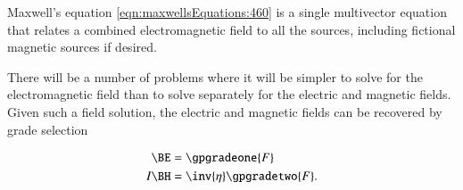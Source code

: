 Maxwell's equation \cref{eqn:maxwellsEquations:460} is a
single multivector equation that relates a combined electromagnetic field to all the sources, including fictional magnetic sources if desired.

There will be a number of problems where it will be simpler to solve for the electromagnetic field than to solve separately for the electric and magnetic fields.  Given such a field solution, the electric and magnetic fields can be recovered by grade selection

\begin{dmath}\label{eqn:isotropicMaxwells:480}
\begin{aligned}
\BE &= \gpgradeone{F} \\
I \BH &= \inv{\eta} \gpgradetwo{F}.
\end{aligned}
\end{dmath}


